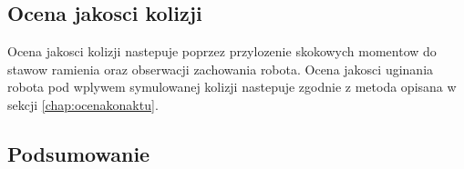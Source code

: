 \subsection{Ocena jakosci kolizji}
Ocena jakosci kolizji nastepuje poprzez przylozenie skokowych momentow do stawow ramienia oraz obserwacji zachowania robota. Ocena jakosci uginania robota pod wplywem  symulowanej kolizji nastepuje zgodnie z metoda opisana w sekcji \ref{chap:ocenakonaktu}.

\subsection{Podsumowanie}
